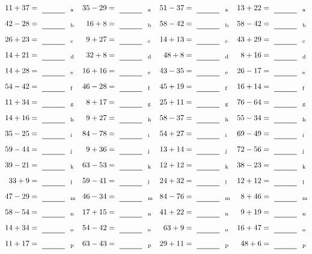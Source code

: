 \documentclass
[
  draft    = true,
  fontsize = 11pt,
  parskip  = half-
]
{scrartcl}
\begin{document}
\clearpage
\begin{align*}
    \pline{11+37}&=\rline{a}
  & \pline{35-29}&=\rline{a}
  & \pline{51-37}&=\rline{a}
  & \pline{13+22}&=\rline{a} \\[1ex]
    \pline{42-28}&=\rline{b}
  & \pline{16+8}&=\rline{b}
  & \pline{58-42}&=\rline{b}
  & \pline{58-42}&=\rline{b} \\[1ex]
    \pline{26+23}&=\rline{c}
  & \pline{9+27}&=\rline{c}
  & \pline{14+13}&=\rline{c}
  & \pline{43+29}&=\rline{c} \\[1ex]
    \pline{14+21}&=\rline{d}
  & \pline{32+8}&=\rline{d}
  & \pline{48+8}&=\rline{d}
  & \pline{8+16}&=\rline{d} \\[1ex]
    \pline{14+28}&=\rline{e}
  & \pline{16+16}&=\rline{e}
  & \pline{43-35}&=\rline{e}
  & \pline{26-17}&=\rline{e} \\[1ex]
    \pline{54-42}&=\rline{f}
  & \pline{46-28}&=\rline{f}
  & \pline{45+19}&=\rline{f}
  & \pline{16+14}&=\rline{f} \\[1ex]
    \pline{11+34}&=\rline{g}
  & \pline{8+17}&=\rline{g}
  & \pline{25+11}&=\rline{g}
  & \pline{76-64}&=\rline{g} \\[1ex]
    \pline{14+16}&=\rline{h}
  & \pline{9+27}&=\rline{h}
  & \pline{58-37}&=\rline{h}
  & \pline{55-34}&=\rline{h} \\[1ex]
    \pline{35-25}&=\rline{i}
  & \pline{84-78}&=\rline{i}
  & \pline{54+27}&=\rline{i}
  & \pline{69-49}&=\rline{i} \\[1ex]
    \pline{59-44}&=\rline{j}
  & \pline{9+36}&=\rline{j}
  & \pline{13+14}&=\rline{j}
  & \pline{72-56}&=\rline{j} \\[1ex]
    \pline{39-21}&=\rline{k}
  & \pline{63-53}&=\rline{k}
  & \pline{12+12}&=\rline{k}
  & \pline{38-23}&=\rline{k} \\[1ex]
    \pline{33+9}&=\rline{l}
  & \pline{59-41}&=\rline{l}
  & \pline{24+32}&=\rline{l}
  & \pline{12+12}&=\rline{l} \\[1ex]
    \pline{47-29}&=\rline{m}
  & \pline{46-34}&=\rline{m}
  & \pline{84-76}&=\rline{m}
  & \pline{8+46}&=\rline{m} \\[1ex]
    \pline{58-54}&=\rline{n}
  & \pline{17+15}&=\rline{n}
  & \pline{41+22}&=\rline{n}
  & \pline{9+19}&=\rline{n} \\[1ex]
    \pline{14+34}&=\rline{o}
  & \pline{54-42}&=\rline{o}
  & \pline{63+9}&=\rline{o}
  & \pline{16+47}&=\rline{o} \\[1ex]
    \pline{11+17}&=\rline{p}
  & \pline{63-43}&=\rline{p}
  & \pline{29+11}&=\rline{p}
  & \pline{48+6}&=\rline{p}
\end{align*}
\end{document}
